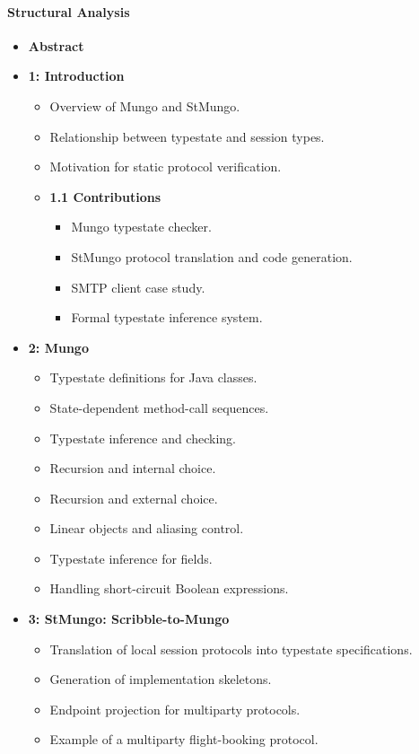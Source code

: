 \paragraph{Structural Analysis}
\begin{itemize}
    \item \textbf{Abstract}

    \item \textbf{1: Introduction}
    \begin{itemize}
        \item Overview of Mungo and StMungo.
        \item Relationship between typestate and session types.
        \item Motivation for static protocol verification.
        \item \textbf{1.1 Contributions}
        \begin{itemize}
            \item Mungo typestate checker.
            \item StMungo protocol translation and code generation.
            \item SMTP client case study.
            \item Formal typestate inference system.
        \end{itemize}
    \end{itemize}

    \item \textbf{2: Mungo}
    \begin{itemize}
        \item Typestate definitions for Java classes.
        \item State-dependent method-call sequences.
        \item Typestate inference and checking.
        \item Recursion and internal choice.
        \item Recursion and external choice.
        \item Linear objects and aliasing control.
        \item Typestate inference for fields.
        \item Handling short-circuit Boolean expressions.
    \end{itemize}

    \item \textbf{3: StMungo: Scribble-to-Mungo}
    \begin{itemize}
        \item Translation of local session protocols into typestate specifications.
        \item Generation of implementation skeletons.
        \item Endpoint projection for multiparty protocols.
        \item Example of a multiparty flight-booking protocol.
    \end{itemize}


\end{itemize}
